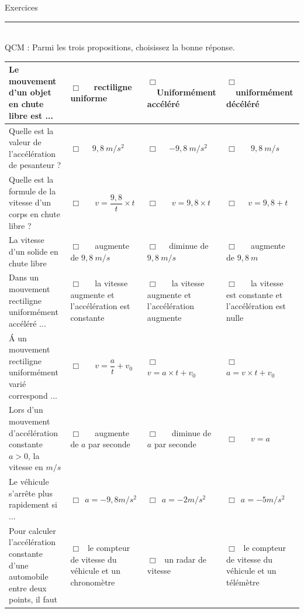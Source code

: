 \documentclass[11pt,a4paper]{article}
\begin{document}
\begin{center}
 \LARGE{Exercices } \\[3mm]
\end{center}



\normalsize

\hrule\
\\[0,5cm]


 QCM : Parmi les trois propositions, choisissez la bonne réponse. 

\begin{center}



    \begin{tabular}{|p{6cm}|C{3cm}|C{3cm}|C{3cm}|}
         \hline
        Le mouvement d'un objet en chute libre est ...& $\Box $ ~~rectiligne uniforme& $\Box $ ~~Uniformément accéléré    & $\Box $ ~~uniformément décéléré \\
         \hline
       Quelle est la valeur de l'accélération de pesanteur ?  & $\Box $ ~~$9,8~m/s^2$ & $\Box $ ~~$-9,8~m/s^2$  & $\Box $ ~~ $9,8~m/s$ \\
         \hline
          Quelle est la formule de la vitesse d'un corps en chute libre ?  &$\Box $ ~~ $v=\dfrac{9,8}{t} \times t$  &$\Box $ ~~ $v=9,8 \times t$  & $\Box $ ~~$v=9,8 + t$  \\
         \hline
          La vitesse d'un solide en chute libre & $\Box $ ~~ augmente de $9,8~m/s $ & $\Box $ ~~diminue de $9,8~m/s$ & $\Box $ ~~ augmente de $9,8~m$ \\
         \hline
          Dans un mouvement rectiligne uniformément accéléré ... &$\Box $ ~~ la vitesse augmente et l'accélération est constante & $\Box $ ~~ la vitesse augmente et l'accélération augmente & $\Box $ ~~ la vitesse est constante et l'accélération est nulle \\
         \hline
         \'A un mouvement rectiligne uniformément varié correspond ... & $\Box $ ~~ $v=\dfrac{a}{t}+v_0$ & $\Box $ ~~  $v=a \times t + v_0$ & $\Box $ ~~  $a=v \times t + v_0$ \\
         \hline
          Lors d'un mouvement d'accélération constante $a>0$, la vitesse en $m/s$ &$\Box$ ~~ augmente de $a$ par seconde & $\Box$ ~~ diminue de $a$ par seconde &$\Box$ ~~ $v=a$ \\
         \hline
          Le véhicule s'arrête plus rapidement si ...  &$\Box ~~ a=-9,8 m/s^2$ &$\Box ~~ a=-2 m/s^2 $  & $\Box ~~ a=-5 m/s^2$ \\ 
         \hline 
          Pour calculer l'accélération constante d'une automobile entre deux points, il faut  &$\Box ~~ $ le compteur de vitesse du véhicule et un chronomètre   &$\Box ~~ $ un radar de vitesse   &$\Box ~~ $ le compteur de vitesse du véhicule et un télémètre \\
         \hline


\end{tabular}
\end{center}
\end{document}

